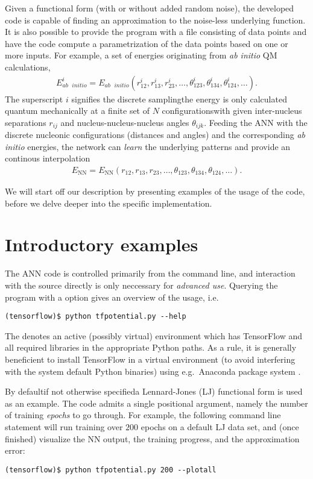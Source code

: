 \documentclass[../../master.tex]{subfiles}
\begin{document}
Given a functional form (with or without added random noise), the developed code is capable of finding an approximation to the noise-less underlying function. It is also possible to provide the program with a file consisting of data points and have the code compute a parametrization of the data points based on one or more inputs. For example, a set of energies originating from \emph{ab initio} QM calculations,
\begin{align}
E_{ab\text{ }initio}^i=E_{ab\text{ }initio}(r^i_{12},r^i_{13},r^i_{23},\dots,\theta^i_{123},\theta^i_{134},\theta^i_{124},\dots).
\end{align}
The superscript $i$ signifies the discrete sampling\textemdash the energy is only calculated quantum mechanically at a finite set of $N$ configurations\textemdash with given inter-nucleus separations $r_{ij}$ and nucleus-nucleus-nucleus angles $\theta_{ijk}$. Feeding the ANN with the discrete nucleonic configurations (distances and angles) and the corresponding \emph{ab initio} energies, the network can \emph{learn} the underlying patterns and provide an continous interpolation 
\begin{align}
E_\text{NN}=E_\text{NN}(r_{12},r_{13},r_{23},\dots,\theta_{123},\theta_{134},\theta_{124},\dots).
\end{align}

We will start off our description by presenting examples of the usage of the code, before we delve deeper into the specific implementation. 

\section{Introductory examples \label{nnimpintro}}
The ANN code is controlled primarily from the command line, and interaction with the source directly is only neccessary for \emph{advanced use}. Querying the program with a  option gives an overview of the usage, i.e.\
\begin{lstlisting}
(tensorflow)$ python tfpotential.py --help
\end{lstlisting}
The  denotes an active (possibly virtual) environment which has TensorFlow and all required libraries in the appropriate Python paths. As a rule, it is generally beneficient to install TensorFlow in a virtual environment (to avoid interfering with the system default Python binaries) using e.g.\ Anaconda package system \cite{anaconda}. 

By default\textemdash if not otherwise specified\textemdash a Lennard-Jones (LJ) functional form is used as an example. The code admits a single positional argument, namely the number of training \emph{epochs} to go through. For example, the following command line statement will run training over $200$ epochs on a default LJ data set, and (once finished) visualize the NN output, the training progress, and the approximation error:
\begin{lstlisting}
(tensorflow)$ python tfpotential.py 200 --plotall
\end{lstlisting}
\end{document}
